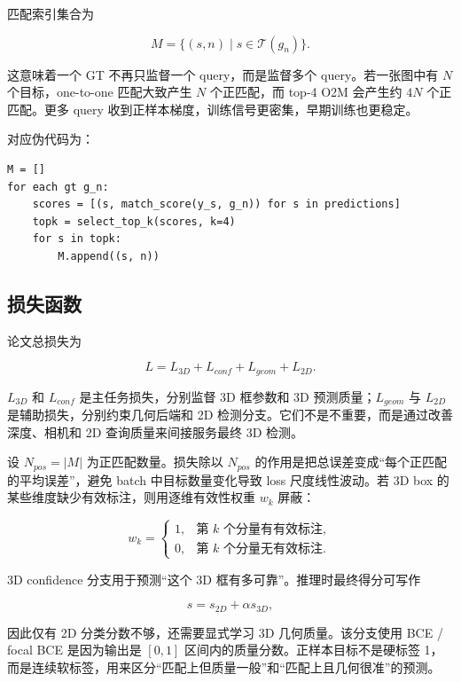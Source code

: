 匹配索引集合为

\begin{equation}
    M=\{(s,n)\mid s\in\mathcal{T}(g_n)\}.
\end{equation}

这意味着一个 GT 不再只监督一个 query，而是监督多个 query。若一张图中有 $N$ 个目标，one-to-one 匹配大致产生 $N$ 个正匹配，而 top-4 O2M 会产生约 $4N$ 个正匹配。更多 query 收到正样本梯度，训练信号更密集，早期训练也更稳定。

对应伪代码为：

\begin{verbatim}
M = []
for each gt g_n:
    scores = [(s, match_score(y_s, g_n)) for s in predictions]
    topk = select_top_k(scores, k=4)
    for s in topk:
        M.append((s, n))
\end{verbatim}

\subsection{损失函数}

论文总损失为

\begin{equation}
    L = L_{3D} + L_{conf} + L_{geom} + L_{2D}.
\end{equation}

$L_{3D}$ 和 $L_{conf}$ 是主任务损失，分别监督 3D 框参数和 3D 预测质量；$L_{geom}$ 与 $L_{2D}$ 是辅助损失，分别约束几何后端和 2D 检测分支。它们不是不重要，而是通过改善深度、相机和 2D 查询质量来间接服务最终 3D 检测。

设 $N_{pos}=|M|$ 为正匹配数量。损失除以 $N_{pos}$ 的作用是把总误差变成“每个正匹配的平均误差”，避免 batch 中目标数量变化导致 loss 尺度线性波动。若 3D box 的某些维度缺少有效标注，则用逐维有效性权重 $w_k$ 屏蔽：

\begin{equation}
    w_k =
    \begin{cases}
        1, & \text{第 } k \text{ 个分量有有效标注},\\
        0, & \text{第 } k \text{ 个分量无有效标注}.
    \end{cases}
\end{equation}

3D confidence 分支用于预测“这个 3D 框有多可靠”。推理时最终得分可写作

\begin{equation}
    s = s_{2D} + \alpha s_{3D},
\end{equation}

因此仅有 2D 分类分数不够，还需要显式学习 3D 几何质量。该分支使用 BCE / focal BCE 是因为输出是 $[0,1]$ 区间内的质量分数。正样本目标不是硬标签 1，而是连续软标签，用来区分“匹配上但质量一般”和“匹配上且几何很准”的预测。

